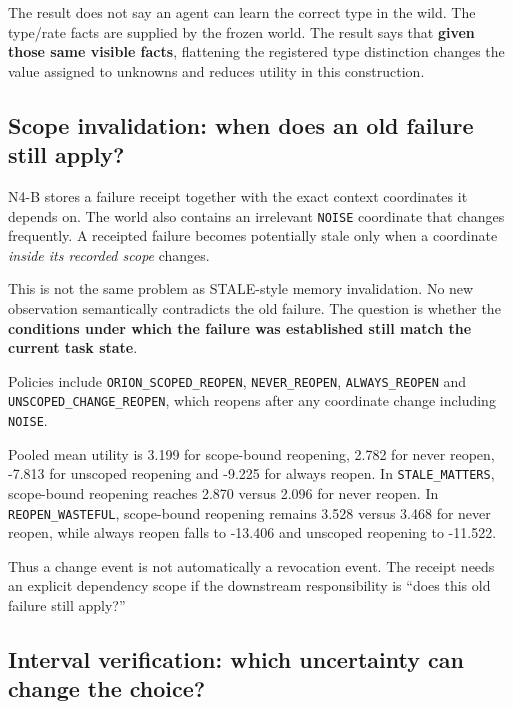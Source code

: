 \documentclass[10pt]{article}
\begin{document}
The result does not say an agent can learn the correct type in the wild.
The type/rate facts are supplied by the frozen world. The result says
that \textbf{given those same visible facts}, flattening the registered
type distinction changes the value assigned to unknowns and reduces
utility in this construction.

\hypertarget{scope-invalidation-when-does-an-old-failure-still-apply}{%
\subsection{Scope invalidation: when does an old failure still
apply?}\label{scope-invalidation-when-does-an-old-failure-still-apply}}

N4-B stores a failure receipt together with the exact context
coordinates it depends on. The world also contains an irrelevant
\texttt{NOISE} coordinate that changes frequently. A receipted failure
becomes potentially stale only when a coordinate \emph{inside its
recorded scope} changes.

This is not the same problem as STALE-style memory invalidation. No new
observation semantically contradicts the old failure. The question is
whether the \textbf{conditions under which the failure was established
still match the current task state}.

Policies include \texttt{ORION\_SCOPED\_REOPEN}, \texttt{NEVER\_REOPEN},
\texttt{ALWAYS\_REOPEN} and \texttt{UNSCOPED\_CHANGE\_REOPEN}, which
reopens after any coordinate change including \texttt{NOISE}.

Pooled mean utility is 3.199 for scope-bound reopening, 2.782 for never
reopen, -7.813 for unscoped reopening and -9.225 for always reopen. In
\texttt{STALE\_MATTERS}, scope-bound reopening reaches 2.870 versus
2.096 for never reopen. In \texttt{REOPEN\_WASTEFUL}, scope-bound
reopening remains 3.528 versus 3.468 for never reopen, while always
reopen falls to -13.406 and unscoped reopening to -11.522.

Thus a change event is not automatically a revocation event. The receipt
needs an explicit dependency scope if the downstream responsibility is
``does this old failure still apply?''

\hypertarget{interval-verification-which-uncertainty-can-change-the-choice}{%
\subsection{Interval verification: which uncertainty can change the
choice?}\label{interval-verification-which-uncertainty-can-change-the-choice}}
\end{document}

